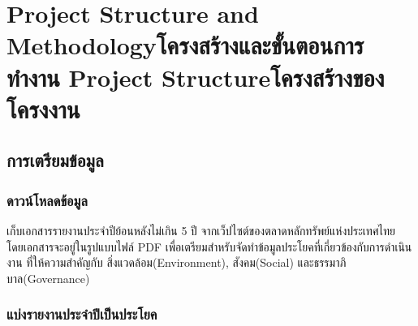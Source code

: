 \chapter{\ifproject%
\ifenglish Project Structure and Methodology\else โครงสร้างและขั้นตอนการทำงาน\fi
\else%
\ifenglish Project Structure\else โครงสร้างของโครงงาน\fi
\fi
}

\makeatletter


\makeatother

\section{การเตรียมข้อมูล}


\subsection{ดาวน์โหลดข้อมูล}

\enskip \enskip \enskip เก็บเอกสารรายงานประจำปีย้อนหลังไม่เกิน 5 ปี จากเว็ปไซต์ของตลาดหลักทรัพย์แห่งประเทศไทย
โดยเอกสารจะอยู่ในรูปแบบไฟล์ PDF เพื่อเตรียมสำหรับจัดทำข้อมูลประโยคที่เกี่ยวข้องกับการดำเนินงาน
ที่ให้ความสำคัญกับ สิ่งแวดล้อม(Environment), สังคม(Social) และธรรมาภิบาล(Governance) 

\subsection{แบ่งรายงานประจำปีเป็นประโยค}

